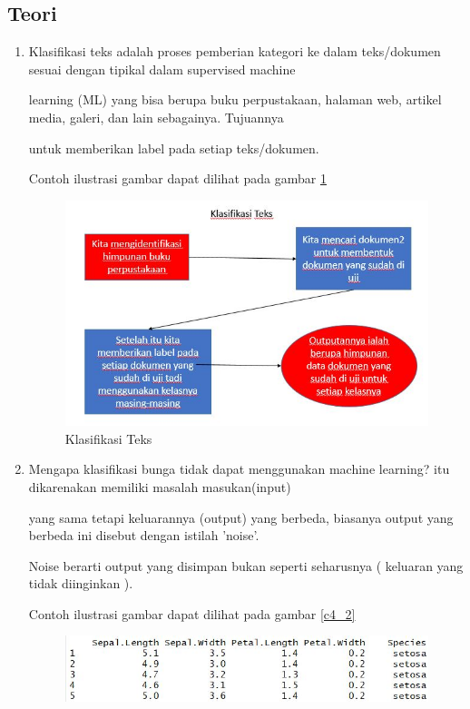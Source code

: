 \subsection{Teori}
\begin{enumerate}
\item Klasifikasi teks adalah proses pemberian kategori ke dalam teks/dokumen sesuai dengan tipikal dalam supervised machine
\par learning (ML) yang bisa berupa buku perpustakaan, halaman web, artikel media, galeri, dan lain sebagainya. Tujuannya 
\par untuk memberikan label pada setiap teks/dokumen.
\par Contoh ilustrasi gambar dapat dilihat pada gambar \ref{c4_1}
\begin{figure}[ht]
	\centerline{\includegraphics[width=1\textwidth]{figures/huda/chapter4/1.JPG}}
	\caption{Klasifikasi Teks}
	\label{c4_1}
\end{figure}
\item Mengapa klasifikasi bunga tidak dapat menggunakan machine learning? itu dikarenakan memiliki masalah masukan(input) 
\par yang sama tetapi keluarannya (output) yang berbeda, biasanya output yang berbeda ini disebut dengan istilah 'noise'.
\par Noise berarti output yang disimpan bukan seperti seharusnya ( keluaran yang tidak diinginkan ). 
\par Contoh ilustrasi gambar dapat dilihat pada gambar \ref{c4_2}
\begin{figure}[ht]
	\centerline{\includegraphics[width=1\textwidth]{figures/huda/chapter4/2.JPG}}

\end{figure}
\end{enumerate}
